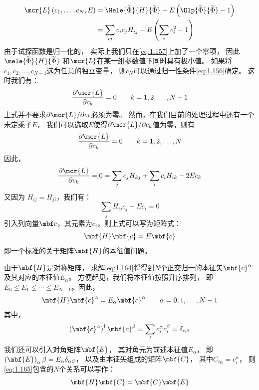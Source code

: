 \begin{equation}
 \begin{split}
     \mcr{L}\left(c_1, \dots, c_N, E\right) &= \Mele{\widetilde\Phi}{H}{\widetilde\Phi} - E\left(\Olp{\widetilde\Phi}{\widetilde\Phi} - 1\right) \\
     &= \sum_{ij} c_ic_jH_{ij} - E\left(\sum_i c_i^2 -1\right)
 \end{split}
 \label{eq:1.159}
\end{equation}
由于试探函数是归一化的，
实际上我们只在\autoref{eq:1.157}上加了一个零项，
因此$\mele{\widetilde\Phi}{H}{\widetilde\Phi}$ 和$\mcr{L}$在某一组参数值下同时具有极小值。
如果将$c_1, c_2, \dots, c_{N-1}$选为任意的独立变量，
则$c_N$可以通过归一性条件\autoref{eq:1.156}确定。
这时我们有：
\begin{equation}
 \frac{\partial \mcr{L}}{\partial c_k} = 0 \qquad k = 1, 2, \dots, N-1
 \label{eq:1.160}
\end{equation}
上式并不要求$\partial\mcr{L}/\partial{c_k}$必须为零。
然而，在我们目前的处理过程中还有一个未定乘子$E$，
我们可以选取$E$使得$\partial\mcr{L}/\partial{c_k}$值为零，则有
\begin{equation}
 \frac{\partial \mcr{L}}{\partial c_k} = 0 \qquad k = 1, 2, \dots, N
 \label{eq:1.161}
\end{equation}
因此，
\begin{equation}
 \frac{\partial \mcr{L}}{\partial c_k} = 0 = \sum_j c_j H_{kj} + \sum_i c_i H_{ik} - 2 E c_k
 \label{eq:1.162}
\end{equation}
又因为 $H_{ij} = H_{ji}$，我们有：
\begin{equation}
 \sum_j H_{ij}c_j - Ec_i = 0
 \label{eq:1.163}
\end{equation}
引入列向量$\mbf c$，其元素为$c_i$，则上式可以写为矩阵式：
\begin{equation}
 \mbf{H}\mbf{c} = E \mbf{c}
 \label{eq:1.164}
\end{equation}
即一个标准的关于矩阵$\mbf{H}$的本征值问题。

由于$\mbf{H}$是对称矩阵，
求解\autoref{eq:1.164}将得到$N$个正交归一的本征矢$\mbf{c}^\alpha$及其对应的本征值$E_\alpha$。
方便起见，我们将本征值按照升序排列，
即$E_0 \leq E_1 \leq \cdots \leq E_{N-1}$。因此，
\begin{equation}
 \mbf{H}\mbf{c}^\alpha = E_\alpha \mbf{c}^\alpha\qquad \alpha = 0, 1, \dots, N-1
 \label{eq:1.165}
\end{equation}
其中，
\begin{equation}
 \left(\mbf{c}^\alpha\right)^\dagger\mbf{c}^\beta = \sum_i c_i^\alpha c_i^\beta = \delta_{\alpha\beta}
 \label{eq:1.166}
\end{equation}
我们还可以引入对角矩阵$\mbf{E}$，
其对角元为前述本征值$E_\alpha$，
即$\left(\mbf{E}\right)_\alpha\beta = E_\alpha\delta_{\alpha\beta}$，
以及由本征矢组成的矩阵$\mbf{C}$，
其中$C_{i\alpha} = c_i^\alpha$，
则\autoref{eq:1.165}包含的$N$个关系可以写作：
\begin{equation}
 \mbf{H}\mbf{C} = \mbf{C}\mbf{E}
 \label{eq:1.167}
\end{equation}

